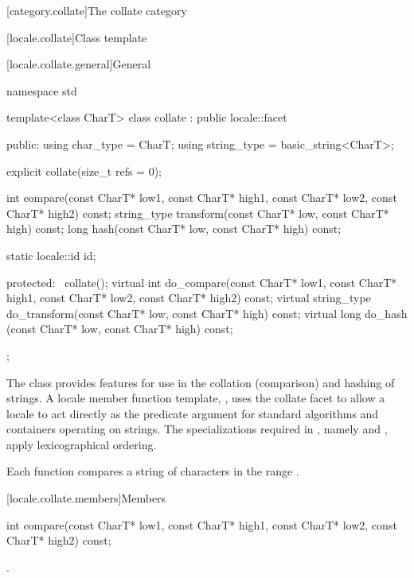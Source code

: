 [category.collate]{The collate category}

[locale.collate]{Class template }

[locale.collate.general]{General}

%
\begin{codeblock}
namespace std {
  template<class CharT>
    class collate : public locale::facet {
    public:
      using char_type   = CharT;
      using string_type = basic_string<CharT>;

      explicit collate(size_t refs = 0);

      int compare(const CharT* low1, const CharT* high1,
                  const CharT* low2, const CharT* high2) const;
      string_type transform(const CharT* low, const CharT* high) const;
      long hash(const CharT* low, const CharT* high) const;

      static locale::id id;

    protected:
      ~collate();
      virtual int do_compare(const CharT* low1, const CharT* high1,
                             const CharT* low2, const CharT* high2) const;
      virtual string_type do_transform(const CharT* low, const CharT* high) const;
      virtual long do_hash (const CharT* low, const CharT* high) const;
    };
}
\end{codeblock}

\pnum
The class  provides features
for use in the collation (comparison) and hashing of strings.
A locale member function template, ,
uses the collate facet to allow a locale to act directly as
the predicate argument for standard algorithms and
containers operating on strings.
The specializations
required in ,
namely  and ,
apply lexicographical ordering.

\pnum
Each function compares a string of characters 
in the range .

[locale.collate.members]{Members}

%
\begin{itemdecl}
int compare(const CharT* low1, const CharT* high1,
            const CharT* low2, const CharT* high2) const;
\end{itemdecl}

\begin{itemdescr}
\pnum
\returns
{}.
\end{itemdescr}

